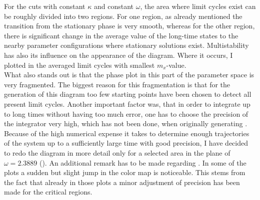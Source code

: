 For the cuts with constant $\kappa$ and constant $\omega$, the area where limit cycles exist can be roughly divided into two regions. For one region, as already mentioned the transition from the stationary phase is very smooth, whereas for the other region, there is significant change in the average value of the long-time states to the nearby parameter configurations where stationary solutions exist. Multistability has also its influence on the appearance of the diagram. Where it occurs, I plotted in  the averaged limit cycles with smallest $m_x$-value. \\What also stands out is that the phase plot in this part of the parameter space is very fragmented. The biggest reason for this fragmentation is that for the generation of this diagram too few starting points have been chosen to detect all present limit cycles. Another important factor was, that in order to integrate up to long times without having too much error, one has to choose the precision of the integrator very high, which has not been done, when originally generating . \\Because of the high numerical expense it takes to determine enough trajectories of the system up to a sufficiently large time with good precision, I have decided to redo the diagram in more detail only for a selected area in the plane of $\omega=2.3889$ (). An additional remark has to be made regarding . In some of the plots a sudden but slight jump in the color map is noticeable. This stems from the fact that already in those plots a minor adjustment of precision has been made for the critical regions. %
